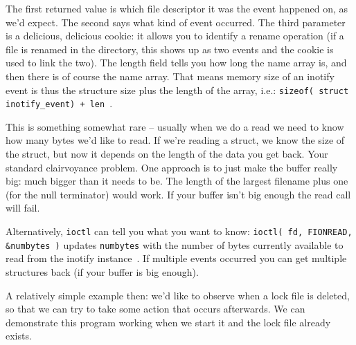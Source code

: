 The first returned value is which file descriptor it was the event happened on, as we'd expect. The second says what kind of event occurred. The third parameter is a delicious, delicious cookie: it allows you to identify a rename operation (if a file is renamed in the directory, this shows up as two events and the cookie is used to link the two). The length field tells you how long the name array is, and then there is of course the name array. That means memory size of an inotify event is thus the structure size plus the length of the array, i.e.: \texttt{sizeof( struct inotify\_event) + len}~\cite{lpi}.

This is something somewhat rare -- usually when we do a read we need to know how many bytes we'd like to read. If we're reading a struct, we know the size of the struct, but now it depends on the length of the data you get back. Your standard clairvoyance problem. One approach is to just make the buffer really big: much bigger than it needs to be. The length of the largest filename plus one (for the null terminator) would work. If your buffer isn't big enough the read call will fail.

Alternatively, \texttt{ioctl} can tell you what you want to know: \texttt{ioctl( fd, FIONREAD, \&numbytes )} updates \texttt{numbytes} with the number of bytes currently available to read from the inotify instance~\cite{lpi}.  If multiple events occurred you can get multiple structures back (if your buffer is big enough).

A relatively simple example then: we'd like to observe when a lock file is deleted, so that we can try to take some action that occurs afterwards. We can demonstrate this program working when we start it and the lock file already exists.

